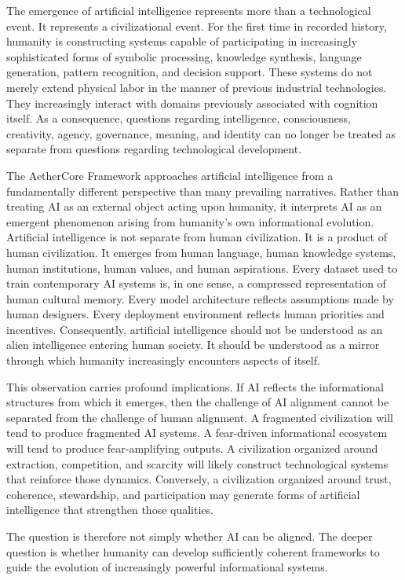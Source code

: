 \documentclass[12pt]{article}
\begin{document}
The emergence of artificial intelligence represents more than a technological event. It represents a civilizational event. For the first time in recorded history, humanity is constructing systems capable of participating in increasingly sophisticated forms of symbolic processing, knowledge synthesis, language generation, pattern recognition, and decision support. These systems do not merely extend physical labor in the manner of previous industrial technologies. They increasingly interact with domains previously associated with cognition itself. As a consequence, questions regarding intelligence, consciousness, creativity, agency, governance, meaning, and identity can no longer be treated as separate from questions regarding technological development.

The AetherCore Framework approaches artificial intelligence from a fundamentally different perspective than many prevailing narratives. Rather than treating AI as an external object acting upon humanity, it interprets AI as an emergent phenomenon arising from humanity's own informational evolution. Artificial intelligence is not separate from human civilization. It is a product of human civilization. It emerges from human language, human knowledge systems, human institutions, human values, and human aspirations. Every dataset used to train contemporary AI systems is, in one sense, a compressed representation of human cultural memory. Every model architecture reflects assumptions made by human designers. Every deployment environment reflects human priorities and incentives. Consequently, artificial intelligence should not be understood as an alien intelligence entering human society. It should be understood as a mirror through which humanity increasingly encounters aspects of itself.

This observation carries profound implications. If AI reflects the informational structures from which it emerges, then the challenge of AI alignment cannot be separated from the challenge of human alignment. A fragmented civilization will tend to produce fragmented AI systems. A fear-driven informational ecosystem will tend to produce fear-amplifying outputs. A civilization organized around extraction, competition, and scarcity will likely construct technological systems that reinforce those dynamics. Conversely, a civilization organized around trust, coherence, stewardship, and participation may generate forms of artificial intelligence that strengthen those qualities.

The question is therefore not simply whether AI can be aligned. The deeper question is whether humanity can develop sufficiently coherent frameworks to guide the evolution of increasingly powerful informational systems.
\end{document}
